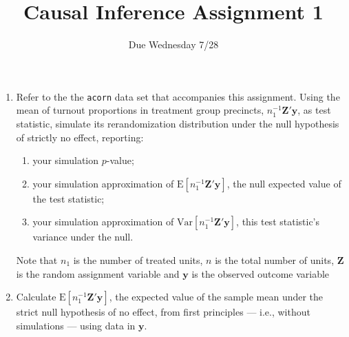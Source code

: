 \documentclass{article}
\title{Causal Inference Assignment 1}
\author{Due Wednesday 7/28}
\begin{document}
\maketitle

\begin{enumerate}
\item Refer to the the \texttt{acorn} data set that accompanies this assignment.  Using the mean of turnout proportions in
treatment group precincts, $n_{1}^{-1}\mathbf{Z}'\mathbf{y}$, as
test statistic, simulate its rerandomization distribution under the
null hypothesis of strictly no effect, reporting: \label{q:simmoments}
\begin{enumerate}
  \item your simulation $p$-value; 
  \item your simulation approximation of $\mathrm{E}[
    n_{1}^{-1}\mathbf{Z}'\mathbf{y}]$, the null expected value of the test
    statistic; 
  \item your simulation approximation of
    $\mathrm{Var}[n_{1}^{-1}\mathbf{Z}'\mathbf{y}]$, this test
    statistic's variance under the null.
  \end{enumerate}
 Note that $n_1$ is the number of treated units, $n$ is the total number of units, $\mathbf{Z}$ is the random assignment variable and $\mathbf{y}$ is the observed outcome variable
\item Calculate $\mathrm{E} [ n_{1}^{-1}\mathbf{Z}'\mathbf{y} ]$, the expected value of the
  sample mean under the strict null hypothesis of no effect, from first principles --- i.e., without simulations ---  using data in $\mathbf{y}$.  \label{q:exactEV}

\end{enumerate}
\end{document}
